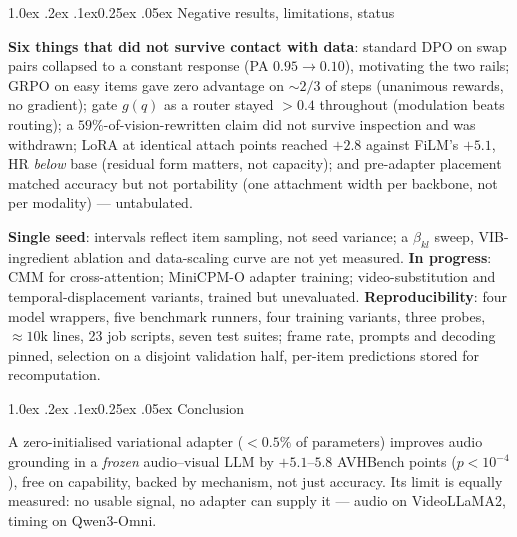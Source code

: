\documentclass[10pt,twocolumn,a4paper]{article}
\makeatletter
\renewcommand\section{\@startsection{section}{1}{\z@}%
  {1.0ex \@plus .2ex \@minus .1ex}{0.25ex \@plus .05ex}%
  {\normalfont\small\bfseries\color{hdr}}}
\makeatother
\begin{document}
\section{Negative results, limitations, status}

\textbf{Six things that did not survive contact with data}: standard DPO on swap pairs collapsed to a
constant response (PA $0.95\!\to\!0.10$), motivating the two rails; GRPO on easy items gave zero
advantage on ${\sim}2/3$ of steps (unanimous rewards, no gradient); gate $g(q)$ as a router stayed
$>0.4$ throughout (modulation beats routing); a $59\%$-of-vision-rewritten claim did not survive
inspection and was withdrawn; LoRA at identical attach points reached $+2.8$ against FiLM's $+5.1$,
HR \emph{below} base (residual form matters, not capacity); and pre-adapter placement matched
accuracy but not portability (one attachment width per backbone, not per modality) --- untabulated.

\textbf{Single seed}: intervals reflect item sampling, not seed variance; a $\beta_{kl}$ sweep,
VIB-ingredient ablation and data-scaling curve are not yet measured. \textbf{In progress}: CMM for
cross-attention; MiniCPM-O adapter training; video-substitution and temporal-displacement variants,
trained but unevaluated. \textbf{Reproducibility}: four model wrappers, five benchmark runners, four
training variants, three probes, ${\approx}10$k lines, 23 job scripts, seven test suites; frame rate,
prompts and decoding pinned, selection on a disjoint validation half, per-item predictions stored for
recomputation.

\section{Conclusion}

A zero-initialised variational adapter ($<\!0.5\%$ of parameters) improves audio grounding in a
\emph{frozen} audio--visual LLM by $+5.1$--$5.8$ AVHBench points ($p<10^{-4}$), free on capability,
backed by mechanism, not just accuracy. Its limit is equally measured: no usable signal, no adapter can
supply it --- audio on VideoLLaMA2, timing on Qwen3-Omni.
\end{document}
